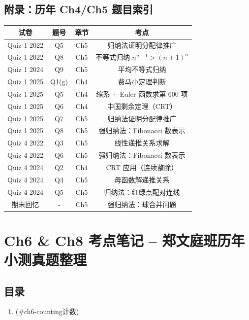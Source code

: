 \documentclass[10pt,a4paper,openany]{ctexbook}
\theoremstyle{definition}
\theoremstyle{remark}
\begin{document}
\vspace{-2pt}

\subsection{附录：历年 Ch4/Ch5 题目索引}

\begin{center}
\begin{tabular}{cccc}
\hline
试卷 & 题号 & 章节 & 考点 \\ \hline
Quiz 1 2022 & Q5 & Ch5 & 归纳法证明分配律推广 \\
Quiz 1 2022 & Q8 & Ch5 & 不等式归纳 $n^{n+1} > (n+1)^n$ \\
Quiz 1 2024 & Q9 & Ch5 & 平均不等式归纳 \\
Quiz 1 2025 & Q1(g) & Ch4 & 费马小定理判断 \\
Quiz 1 2025 & Q5 & Ch4 & 缩系 + Euler 函数求第 600 项 \\
Quiz 1 2025 & Q6 & Ch4 & 中国剩余定理（CRT） \\
Quiz 1 2025 & Q7 & Ch5 & 归纳法证明分配律推广 \\
Quiz 1 2025 & Q8 & Ch5 & 强归纳法：Fibonacci 数表示 \\
Quiz 4 2022 & Q3 & Ch5 & 线性递推关系求解 \\
Quiz 4 2022 & Q6 & Ch5 & 强归纳法：Fibonacci 数表示 \\
Quiz 4 2024 & Q2 & Ch4 & CRT 应用（连续整除） \\
Quiz 4 2024 & Q4 & Ch5 & 母函数解递推关系 \\
Quiz 4 2024 & Q5 & Ch5 & 归纳法：红绿点配对连线 \\
期末回忆 & - & Ch5 & 强归纳法：球合并问题 \\
\hline
\end{tabular}

\end{center}

\section{Ch6 \& Ch8 考点笔记 -- 郑文庭班历年小测真题整理}

\vspace{-2pt}

\subsection{目录}

\begin{enumerate}
\item [Ch6: Counting（计数）](\#ch6-counting计数)
\end{enumerate}
\end{document}
